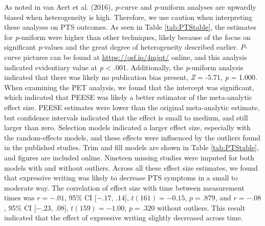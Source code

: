 \documentclass[man, mask]{apa6}
\theoremstyle{definition}
\theoremstyle{definition}
\theoremstyle{definition}
\theoremstyle{remark}
\begin{document}
As noted in van Aert et al. (2016), \emph{p}-curve and \emph{p}-uniform
analyses are upwardly biased when heterogeneity is high. Therefore, we
use caution when interpreting these analyses on PTS outcomes. As seen in
Table \ref{tab:PTStable}, the estimates for \emph{p}-uniform were higher
than other techniques, likely because of the focus on significant
\emph{p}-values and the great degree of heterogeneity described earlier.
\emph{P}-curve pictures can be found at \url{https://osf.io/4mjqt/}
online, and this analysis indicated evidentiary value at \emph{p}
\textless{} .001. Additionally, the \emph{p}-uniform analysis indicated
that there was likely no publication bias present, \emph{Z} = -5.71,
\emph{p} = 1.000. When examining the PET analysis, we found that the
intercept was significant, which indicated that PEESE was likely a
better estimator of the meta-analytic effect size. PEESE estimates were
lower than the original meta-analytic estimate, but confidence intervals
indicated that the effect is small to medium, and still larger than
zero. Selection models indicated a larger effect size, especially with
the random-effects models, and these effects were influenced by the
outliers found in the published studies. Trim and fill models are shown
in Table \ref{tab:PTStable}, and figures are included online. Nineteen
missing studies were imputed for both models with and without outliers.
Across all these effect size estimates, we found that expressive writing
was likely to decrease PTS symptoms in a small to moderate way. The
correlation of effect size with time between measurement times was
\(r = -.01\), 95\% CI \([-.17\), \(.14]\), \(t(161) = -0.15\),
\(p = .879\), and \(r = -.08\), 95\% CI \([-.23\), \(.08]\),
\(t(159) = -1.00\), \(p = .320\) without outliers. This result indicated
that the effect of expressive writing slightly decreased across time.
\end{document}
